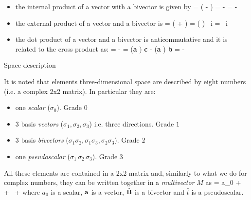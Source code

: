 \documentclass[10pt]{beamer}
\begin{document}

\begin{frame}[fragile]{}
\begin{itemize}

\item the internal product of a vector with a bivector is given by
\be 
\Ba \cdot \hat{\BB}  =  \left(\Ba \hat{\BB} - \hat{\BB} \Ba \right) = - \Ba \times \Bb \times \Bc = - \Ba \times \BB
\ee
\item the external product of a vector and a bivector is
%
\be 
\Ba \wedge \hat{\BB}  =  \left(\Ba \hat{\BB} + \hat{\BB} \Ba \right) =  \Ba \cdot \left( \Bb \times \Bc\right) \,  i  =  \Ba \cdot  \BB  \,  i 
\ee

\item the dot product of a vector and a bivector is anticommutative and it is related to the cross product as:
\be \label{adbwcatbtccs}
\Ba \cdot \Bb \wedge \Bc = - \Ba \times \Bb \times \Bc = ({\bf a}  )    {\bf c} - ({\bf a}  )  {\bf b} = -\Bb \wedge \Bc \cdot \Ba
\ee

\end{itemize}

\end{frame}

\begin{frame}[fragile]{Space description}


It is noted that elements  three-dimensional space are described by eight numbers (i.e. a complex 2x2 matrix). In particular they are: 
\begin{itemize}
\item one \emph{scalar} ($\sigma_0$). Grade $0$
\item 3 basis \emph{vectors} ($\sigma_1, \sigma_2, \sigma_3$) i.e. three directions. Grade $1$
\item 3 basis \emph{bivectors} ($\sigma_1 \sigma_2, \sigma_1 \sigma_3, \sigma_2 \sigma_3$). Grade $2$
\item one \emph{pseudoscalar} ($\sigma_1 \, \sigma_2 \, \sigma_3$). Grade $3$
\end{itemize}
%
All these elements are contained in a 2x2 matrix and, similarly to what we do for complex numbers, they can be written together in a 
\alert{ \emph{multivector} $\mathit{M}$} as
\be \label{Mmultivector}
 = 
a_0 + \, \Ba + \, \hat{\BB} +  
\ee
where $a_0$ is a scalar, $\mathbf{a}$ is a vector, $\hat{\mathbf{B}}$ is a bivector and $\hat{\mathit{t}}$ is a pseudoscalar.

\end{frame}
\end{document}
